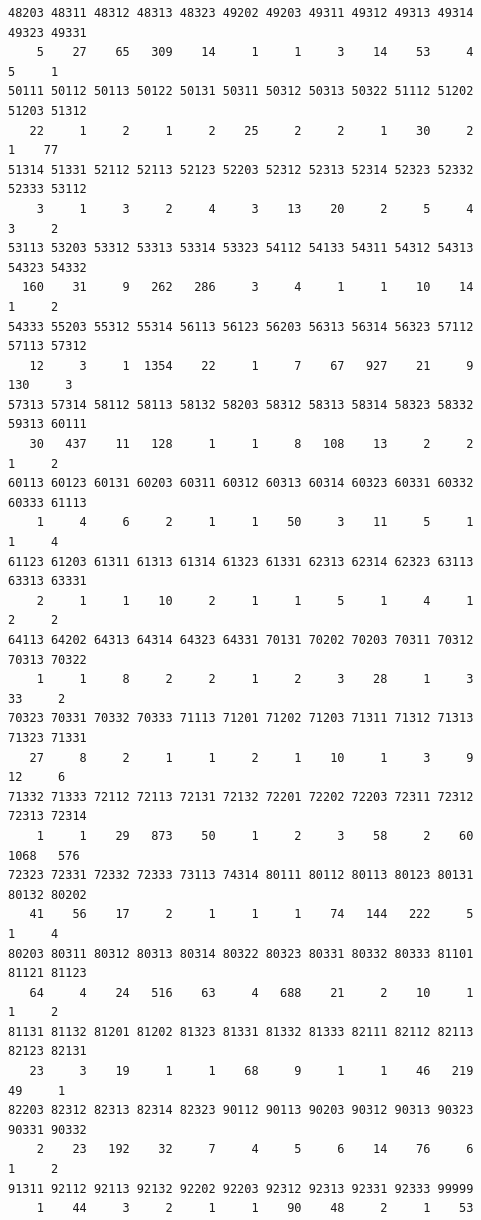 \documentclass[
]{article}
\begin{document}
\begin{verbatim}
48203 48311 48312 48313 48323 49202 49203 49311 49312 49313 49314 49323 49331 
    5    27    65   309    14     1     1     3    14    53     4     5     1 
50111 50112 50113 50122 50131 50311 50312 50313 50322 51112 51202 51203 51312 
   22     1     2     1     2    25     2     2     1    30     2     1    77 
51314 51331 52112 52113 52123 52203 52312 52313 52314 52323 52332 52333 53112 
    3     1     3     2     4     3    13    20     2     5     4     3     2 
53113 53203 53312 53313 53314 53323 54112 54133 54311 54312 54313 54323 54332 
  160    31     9   262   286     3     4     1     1    10    14     1     2 
54333 55203 55312 55314 56113 56123 56203 56313 56314 56323 57112 57113 57312 
   12     3     1  1354    22     1     7    67   927    21     9   130     3 
57313 57314 58112 58113 58132 58203 58312 58313 58314 58323 58332 59313 60111 
   30   437    11   128     1     1     8   108    13     2     2     1     2 
60113 60123 60131 60203 60311 60312 60313 60314 60323 60331 60332 60333 61113 
    1     4     6     2     1     1    50     3    11     5     1     1     4 
61123 61203 61311 61313 61314 61323 61331 62313 62314 62323 63113 63313 63331 
    2     1     1    10     2     1     1     5     1     4     1     2     2 
64113 64202 64313 64314 64323 64331 70131 70202 70203 70311 70312 70313 70322 
    1     1     8     2     2     1     2     3    28     1     3    33     2 
70323 70331 70332 70333 71113 71201 71202 71203 71311 71312 71313 71323 71331 
   27     8     2     1     1     2     1    10     1     3     9    12     6 
71332 71333 72112 72113 72131 72132 72201 72202 72203 72311 72312 72313 72314 
    1     1    29   873    50     1     2     3    58     2    60  1068   576 
72323 72331 72332 72333 73113 74314 80111 80112 80113 80123 80131 80132 80202 
   41    56    17     2     1     1     1    74   144   222     5     1     4 
80203 80311 80312 80313 80314 80322 80323 80331 80332 80333 81101 81121 81123 
   64     4    24   516    63     4   688    21     2    10     1     1     2 
81131 81132 81201 81202 81323 81331 81332 81333 82111 82112 82113 82123 82131 
   23     3    19     1     1    68     9     1     1    46   219    49     1 
82203 82312 82313 82314 82323 90112 90113 90203 90312 90313 90323 90331 90332 
    2    23   192    32     7     4     5     6    14    76     6     1     2 
91311 92112 92113 92132 92202 92203 92312 92313 92331 92333 99999 
    1    44     3     2     1     1    90    48     2     1    53 
\end{verbatim}
\end{document}
